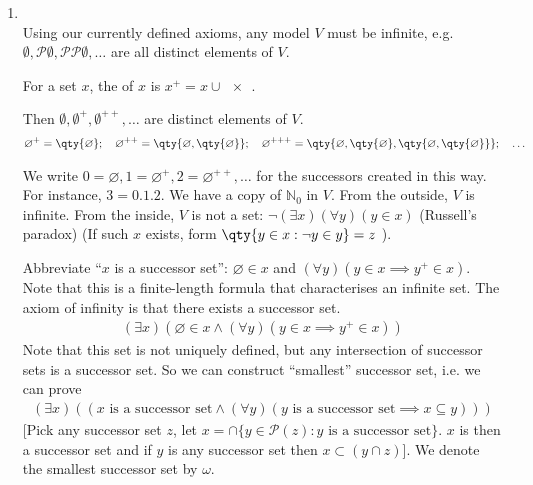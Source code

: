 \begin{enumerate}
    We can also form, from sets $x, y$, $y^x = \qty{f \in \mathcal{P}(x \times y) : f : x \to y}$ which is the set of all functions from $x \to y$.

    \item {} \\
    Using our currently defined axioms, any model $V$ must be infinite, e.g. $\emptyset, \mathcal{P}\emptyset, \mathcal{P}\mathcal{P} \emptyset, \dots$ are all distinct elements of $V$.

    \begin{definition}[Successor]
        For a set $x$, the  of $x$ is $x^+ = x \cup \qty{x}$.
    \end{definition}
    \begin{example}
        Then $\emptyset, \emptyset^+, \emptyset^{++}, \dots$ are distinct elements of $V$.
        \begin{align*}
            \varnothing^+ = \qty{\varnothing};\quad \varnothing^{++} = \qty{\varnothing, \qty{\varnothing}};\quad \varnothing^{+++} = \qty{\varnothing, \qty{\varnothing}, \qty{\varnothing, \qty{\varnothing}}};\quad \dots
        \end{align*}
    \end{example}

    We write $0 = \varnothing, 1 = \varnothing^+, 2 = \varnothing^{++}, \dots$ for the successors created in this way.
    For instance, $3 = \qty{0, 1, 2}$.
    We have a copy of $\mathbb{N}_0$ in $V$.
    From the outside, $V$ is infinite.
    From the inside, $V$ is not a set: $\neg(\exists x)(\forall y) (y \in x)$ (Russell's paradox) (If such $x$ exists, form $\qty{y \in x : \neg y \in y} = z$ \Lightning).

    Abbreviate ``$x$ is a successor set'': $\varnothing \in x$ and $(\forall y)(y \in x \implies y^+ \in x)$.
    Note that this is a finite-length formula that characterises an infinite set.
    The axiom of infinity is that there exists a successor set.
    \begin{align*}
        (\exists x)(\varnothing \in x \wedge (\forall y)(y \in x \implies y^+ \in x))
    \end{align*}
    Note that this set is not uniquely defined, but any intersection of successor sets is a successor set.
    So we can construct ``smallest'' successor set, i.e. we can prove
    \begin{align*}
        (\exists x)((x \text{ is a successor set} \wedge (\forall y)(y \text{ is a successor set} \implies  x \subseteq y)))
    \end{align*}
    [Pick any successor set $z$, let $x = \cap \{y \in \mathcal{P}(z) : y \text{ is a successor set}\}$.
    $x$ is then a successor set and if $y$ is any successor set then $x \subset (y \cap z)$].
    We denote the smallest successor set by $\omega$.


\end{enumerate}
